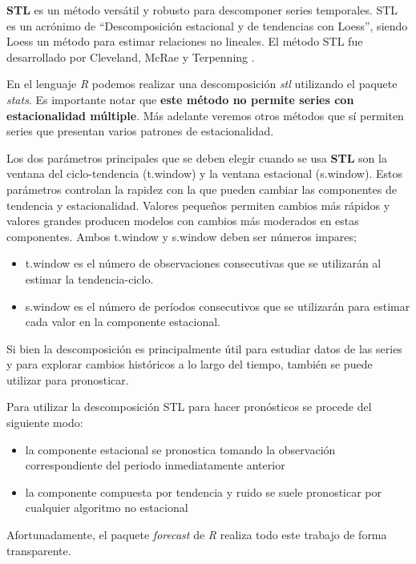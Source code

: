 \documentclass[]{book}
\providecommand{\tightlist}{%
  \setlength{\itemsep}{0pt}\setlength{\parskip}{0pt}}
\begin{document}
\textbf{STL} es un método versátil y robusto para descomponer series
temporales. STL es un acrónimo de ``Descomposición estacional y de
tendencias con Loess'', siendo Loess un método para estimar relaciones
no lineales. El método STL fue desarrollado por Cleveland, McRae y
Terpenning \citep{cleveland1990stl} .

En el lenguaje \emph{R} podemos realizar una descomposición \emph{stl}
utilizando el paquete \emph{stats}. Es importante notar que \textbf{este
método no permite series con estacionalidad múltiple}. Más adelante
veremos otros métodos que sí permiten series que presentan varios
patrones de estacionalidad.

Los dos parámetros principales que se deben elegir cuando se usa
\textbf{STL} son la ventana del ciclo-tendencia (t.window) y la ventana
estacional (s.window). Estos parámetros controlan la rapidez con la que
pueden cambiar las componentes de tendencia y estacionalidad. Valores
pequeños permiten cambios más rápidos y valores grandes producen modelos
con cambios más moderados en estas componentes. Ambos t.window y
s.window deben ser números impares;

\begin{itemize}
\tightlist
\item
  t.window es el número de observaciones consecutivas que se utilizarán
  al estimar la tendencia-ciclo.
\item
  s.window es el número de períodos consecutivos que se utilizarán para
  estimar cada valor en la componente estacional.
\end{itemize}

Si bien la descomposición es principalmente útil para estudiar datos de
las series y para explorar cambios históricos a lo largo del tiempo,
también se puede utilizar para pronosticar.

Para utilizar la descomposición STL para hacer pronósticos se procede
del siguiente modo:

\begin{itemize}
\tightlist
\item
  la componente estacional se pronostica tomando la observación
  correspondiente del periodo inmediatamente anterior
\item
  la componente compuesta por tendencia y ruido se suele pronosticar por
  cualquier algoritmo no estacional
\end{itemize}

Afortunadamente, el paquete \emph{forecast} de \emph{R} realiza todo
este trabajo de forma transparente.
\end{document}

